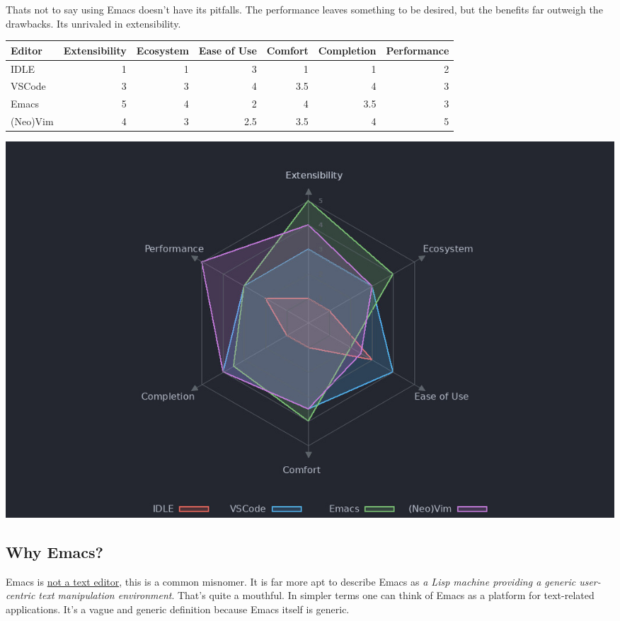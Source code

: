 \documentclass{scrartcl}
\begin{document}
Thats not to say using Emacs doesn't have its pitfalls. The performance leaves
something to be desired, but the benefits far outweigh the drawbacks. Its
unrivaled in extensibility.

\begin{center}
\begin{tabular}{lrrrrrr}
\toprule
Editor & Extensibility & Ecosystem & Ease of Use & Comfort & Completion & Performance\\
\midrule
IDLE & 1 & 1 & 3 & 1 & 1 & 2\\
VSCode & 3 & 3 & 4 & 3.5 & 4 & 3\\
Emacs & 5 & 4 & 2 & 4 & 3.5 & 3\\
(Neo)Vim & 4 & 3 & 2.5 & 3.5 & 4 & 5\\
\bottomrule
\end{tabular}
\end{center}

\begin{center}
\includegraphics[width=.9\linewidth]{./misc/editor-comparison.jpeg}
\end{center}

\subsection{Why Emacs?}
\label{sec:org7a23858}
Emacs is \href{https://www.eigenbahn.com/2020/01/12/emacs-is-no-editor}{not a text editor}, this is a common misnomer. It is far more apt to
describe Emacs as \emph{a Lisp machine providing a generic user-centric text
manipulation environment}. That's quite a mouthful.
In simpler terms one can think of Emacs as a platform for text-related
applications. It's a vague and generic definition because Emacs itself is
generic.
\end{document}
